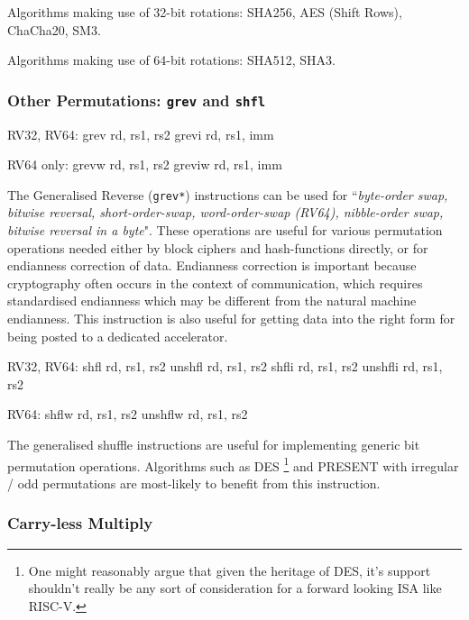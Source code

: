 Algorithms making use of 32-bit rotations:
SHA256, AES (Shift Rows), ChaCha20, SM3.

Algorithms making use of 64-bit rotations:
SHA512, SHA3.

\subsubsection{Other Permutations: {\tt grev} and {\tt shfl}}

\begin{cryptobitmanipisa}
RV32, RV64:
    grev rd, rs1, rs2
    grevi rd, rs1, imm

RV64 only:
    grevw rd, rs1, rs2
    greviw rd, rs1, imm
\end{cryptobitmanipisa}

The Generalised Reverse ({\tt grev*}) instructions can be used for 
``{\em byte-order swap, bitwise reversal, short-order-swap,
word-order-swap (RV64), nibble-order swap, bitwise reversal in a byte}".
These operations are useful for various permutation operations
needed either by block ciphers and hash-functions directly, or for
endianness correction of data.
Endianness correction is important because
cryptography often occurs in the context of communication, which requires
standardised endianness which may be different from the natural machine
endianness.
This instruction is also useful for getting data into the right form
for being posted to a dedicated accelerator.

\begin{cryptobitmanipisa}
RV32, RV64:
    shfl    rd, rs1, rs2
    unshfl  rd, rs1, rs2
    shfli   rd, rs1, rs2
    unshfli rd, rs1, rs2

RV64:
    shflw   rd, rs1, rs2
    unshflw rd, rs1, rs2
\end{cryptobitmanipisa}

The generalised shuffle instructions are useful for implementing
generic bit permutation operations.
Algorithms such as 
DES \footnote{
One might reasonably argue that given the heritage of DES, it's support
shouldn't really be any sort of consideration for a forward looking
ISA like RISC-V.
}
and
PRESENT\cite{block:present} with
irregular / odd permutations are most-likely to benefit from this
instruction.


\subsubsection{Carry-less Multiply}

